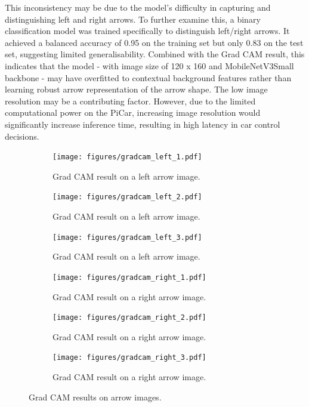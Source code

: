 \documentclass{article}
\begin{document}
This inconsistency may be due to the model's difficulty in capturing and distinguishing left and right arrows. To further examine this, a binary classification model was trained specifically to distinguish left/right arrows. It achieved a balanced accuracy of 0.95 on the training set but only 0.83 on the test set, suggesting limited generalisability. Combined with the Grad CAM result, this indicates that the model - with image size of 120 x 160 and MobileNetV3Small backbone - may have overfitted to contextual background features rather than learning robust arrow representation of the arrow shape. The low image resolution may be a contributing factor. However, due to the limited computational power on the PiCar, increasing image resolution would significantly increase inference time, resulting in high latency in car control decisions.


\begin{figure}[h]
  \centering

  \begin{subfigure}[t]{0.3\textwidth}
    \centering
    \texttt{[image: figures/gradcam\_left\_1.pdf]}
    \caption{Grad CAM result on a left arrow image.}
    \label{fig:gradcam_left_1}
  \end{subfigure}
  \hfill
  \begin{subfigure}[t]{0.3\textwidth}
    \centering
    \texttt{[image: figures/gradcam\_left\_2.pdf]}
    \caption{Grad CAM result on a left arrow image.}
    \label{fig:gradcam_left_2}
  \end{subfigure}
  \hfill
  \begin{subfigure}[t]{0.3\textwidth}
    \centering
    \texttt{[image: figures/gradcam\_left\_3.pdf]}
    \caption{Grad CAM result on a left arrow image.}
    \label{fig:gradcam_left_3}
  \end{subfigure}

  \vspace{1em} %

  \begin{subfigure}[t]{0.3\textwidth}
    \centering
    \texttt{[image: figures/gradcam\_right\_1.pdf]}
    \caption{Grad CAM result on a right arrow image.}
    \label{fig:gradcam_right_1}
  \end{subfigure}
  \hfill
  \begin{subfigure}[t]{0.3\textwidth}
    \centering
    \texttt{[image: figures/gradcam\_right\_2.pdf]}
    \caption{Grad CAM result on a right arrow image.}
    \label{fig:gradcam_right_2}
  \end{subfigure}
  \hfill
  \begin{subfigure}[t]{0.3\textwidth}
    \centering
    \texttt{[image: figures/gradcam\_right\_3.pdf]}
    \caption{Grad CAM result on a right arrow image.}
    \label{fig:gradcam_right_3}
  \end{subfigure}

  \caption{Grad CAM results on arrow images.}
  \label{fig:gradcam_arrow}
\end{figure}
\end{document}
